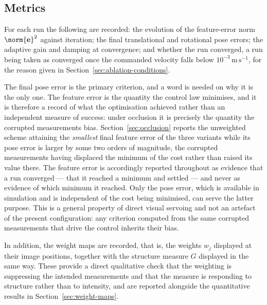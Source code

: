 \subsection{Metrics}
\label{sec:metrics}

For each run the following are recorded: the evolution of the feature-error
norm $\norm{\mathbf{e}}^{2}$ against iteration; the final translational and
rotational pose errors; the adaptive gain and damping at convergence; and
whether the run converged, a run being taken as converged once the commanded
velocity falls below $10^{-3}\,\mathrm{m\,s^{-1}}$, for the reason given in
Section~\ref{sec:ablation-conditions}.

The final pose error is the primary criterion, and a word is needed on why it
is the only one. The feature error is the quantity the control law minimises,
and it is therefore a record of what the optimisation achieved rather than an
independent measure of success: under occlusion it is precisely the quantity
the corrupted measurements bias. Section~\ref{sec:occlusion} reports the
unweighted scheme attaining the \emph{smallest} final feature error of the
three variants while its pose error is larger by some two orders of
magnitude, the corrupted measurements having displaced the minimum of the
cost rather than raised its value there. The feature error is accordingly
reported throughout as evidence that a run converged --- that it reached a
minimum and settled --- and never as evidence of which minimum it reached.
Only the pose error, which is available in simulation and is independent of
the cost being minimised, can serve the latter purpose. This is a general
property of direct visual servoing and not an artefact of the present
configuration: any criterion computed from the same corrupted measurements
that drive the control inherits their bias.

In addition, the weight maps are recorded, that is, the weights $w_{j}$
displayed at their image positions, together with the structure measure $G$
displayed in the same way. These provide a direct qualitative check that the
weighting is suppressing the intended measurements and that the measure is
responding to structure rather than to intensity, and are reported alongside
the quantitative results in Section~\ref{sec:weight-maps}.

